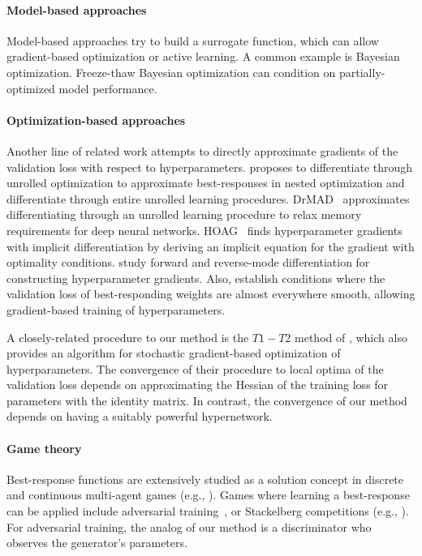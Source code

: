 \documentclass{article} %
\begin{document}
\paragraph{Model-based approaches}
Model-based approaches try to build a surrogate function, which can allow gradient-based optimization or active learning.
A common example is Bayesian optimization.
Freeze-thaw Bayesian optimization can condition on partially-optimized model performance.

\paragraph{Optimization-based approaches}
Another line of related work attempts to directly approximate gradients of the validation loss with respect to hyperparameters.
\citet{domke2012generic} proposes to differentiate through unrolled optimization to approximate best-responses in nested optimization and \citet{maclaurin2015gradient} differentiate through entire unrolled learning procedures.
DrMAD~\citep{fu2016drmad} approximates differentiating through an unrolled learning procedure to relax memory requirements for deep neural networks.
HOAG~\citep{pedregosa2016hyperparameter} finds hyperparameter gradients with implicit differentiation by deriving an implicit equation for the gradient with optimality conditions.
\citet{franceschi2017forward} study forward and reverse-mode differentiation for constructing hyperparameter gradients.
Also, \citet{feng2017gradient} establish conditions where the validation loss of best-responding weights are almost everywhere smooth, allowing gradient-based training of hyperparameters.

A closely-related procedure to our method is the $T1 - T2$ method of \citet{luketina2016scalable}, which also provides an algorithm for stochastic gradient-based optimization of hyperparameters.
The convergence of their procedure to local optima of the validation loss depends on approximating the Hessian of the training loss for parameters with the identity matrix.
In contrast, the convergence of our method depends on having a suitably powerful hypernetwork.

\paragraph{Game theory}
Best-response functions are extensively studied as a solution concept in discrete and continuous multi-agent games (e.g., \citet{fudenberg1998theory}).
Games where learning a best-response can be applied include adversarial training~\citep{goodfellow2014generative}, or Stackelberg competitions (e.g., \citet{bruckner2011stackelberg}).
For adversarial training, the analog of our method is a discriminator who observes the generator's parameters.
\end{document}
